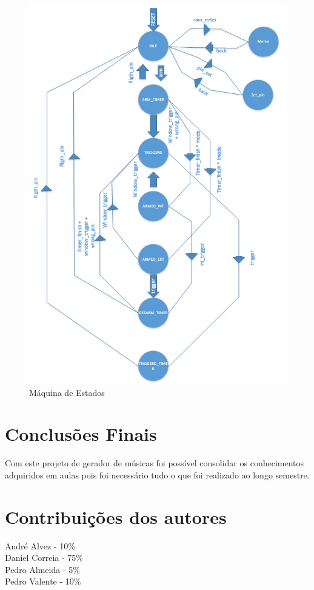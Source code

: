 \documentclass{report}
\begin{document}
	\begin{figure} [h]
		\centering
		\includegraphics[scale=0.7]{img/m_estados.PNG}
		\caption{Máquina de Estados}
	\end{figure}	
	 

	
\chapter{Conclusões Finais}
\label{chap.conclusao}
	Com este projeto de gerador de músicas foi possível consolidar os conhecimentos adquiridos em aulas pois foi necessário tudo o que foi realizado ao longo semestre.  

 
\chapter{Contribuições dos autores}
\label{contribuições}

\noindent
André Alvez - 10\% \\
Daniel Correia - 75\% \\
Pedro Almeida - 5\% \\
Pedro Valente - 10\% 
\end{document}
